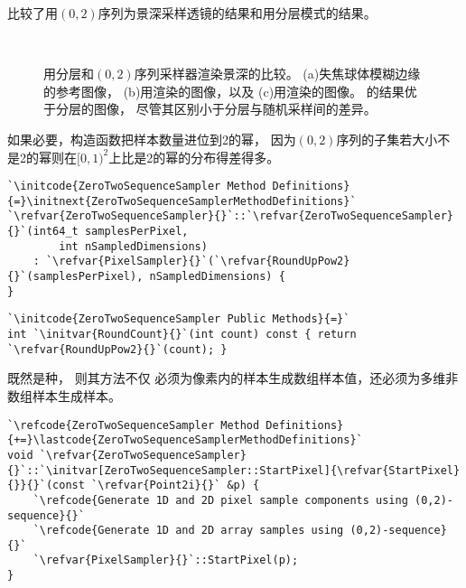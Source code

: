 比较了用$(0,2)$序列为景深采样透镜的结果和用分层模式的结果。
\begin{figure}[htbp]
    \,
    \\
    \caption{用分层和$(0,2)$序列采样器渲染景深的比较。
        (a)失焦球体模糊边缘的参考图像，
        (b)用\protect{}渲染的图像，以及
        (c)用渲染的图像。
        的结果优于分层的图像，
        尽管其区别小于分层与随机采样间的差异。}
    \label{fig:7.30}
\end{figure}

如果必要，构造函数把样本数量进位到2的幂，
因为$(0,2)$序列的子集若大小不是2的幂则在$[0,1)^2$上比是2的幂的分布得差得多。
\begin{lstlisting}
`\initcode{ZeroTwoSequenceSampler Method Definitions}{=}\initnext{ZeroTwoSequenceSamplerMethodDefinitions}`
`\refvar{ZeroTwoSequenceSampler}{}`::`\refvar{ZeroTwoSequenceSampler}{}`(int64_t samplesPerPixel,
        int nSampledDimensions)
    : `\refvar{PixelSampler}{}`(`\refvar{RoundUpPow2}{}`(samplesPerPixel), nSampledDimensions) {
}
\end{lstlisting}
\begin{lstlisting}
`\initcode{ZeroTwoSequenceSampler Public Methods}{=}`
int `\initvar{RoundCount}{}`(int count) const { return `\refvar{RoundUpPow2}{}`(count); }
\end{lstlisting}

既然是种，
则其方法{}不仅
必须为像素内的样本生成数组样本值，还必须为多维非数组样本生成样本。
\begin{lstlisting}
`\refcode{ZeroTwoSequenceSampler Method Definitions}{+=}\lastcode{ZeroTwoSequenceSamplerMethodDefinitions}`
void `\refvar{ZeroTwoSequenceSampler}{}`::`\initvar[ZeroTwoSequenceSampler::StartPixel]{\refvar{StartPixel}{}}{}`(const `\refvar{Point2i}{}` &p) {
    `\refcode{Generate 1D and 2D pixel sample components using (0,2)-sequence}{}`
    `\refcode{Generate 1D and 2D array samples using (0,2)-sequence}{}`
    `\refvar{PixelSampler}{}`::StartPixel(p);
}
\end{lstlisting}

